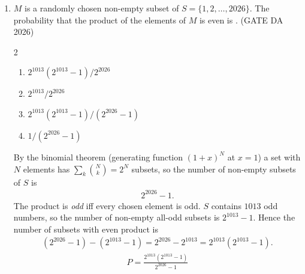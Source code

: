 \begin{enumerate}[label=\textbf{Q.\arabic*},leftmargin=*,start=1]
\item[\textbf{Q.19}] $M$ is a randomly chosen non-empty subset of
$S=\{1,2,\dots,2026\}$. The probability that the product of the elements of $M$
is even is \underline{\hspace{1.5cm}}.
\hfill (GATE DA 2026)
\begin{multicols}{2}
\begin{enumerate}[label=(\alph*),itemsep=0pt]
 \item $2^{1013}(2^{1013}-1)/2^{2026}$
 \item $2^{1013}/2^{2026}$
 \item $2^{1013}(2^{1013}-1)/(2^{2026}-1)$
 \item $1/(2^{2026}-1)$
\end{enumerate}
\end{multicols}
\solution
By the binomial theorem (generating function $(1+x)^N$ at $x=1$) a set with $N$
elements has $\sum_k\binom Nk=2^N$ subsets, so the number of non-empty subsets of $S$ is
\begin{align}
2^{2026}-1 .
\end{align}
The product is \emph{odd} iff every chosen element is odd. $S$ contains $1013$ odd numbers,
so the number of non-empty all-odd subsets is $2^{1013}-1$. Hence the number of
subsets with even product is
\begin{align}
(2^{2026}-1)-(2^{1013}-1)=2^{2026}-2^{1013}=2^{1013}\left(2^{1013}-1\right).
\end{align}
\begin{align}
P=\boxed{\frac{2^{1013}\left(2^{1013}-1\right)}{2^{2026}-1}}
\end{align}


\end{enumerate}
